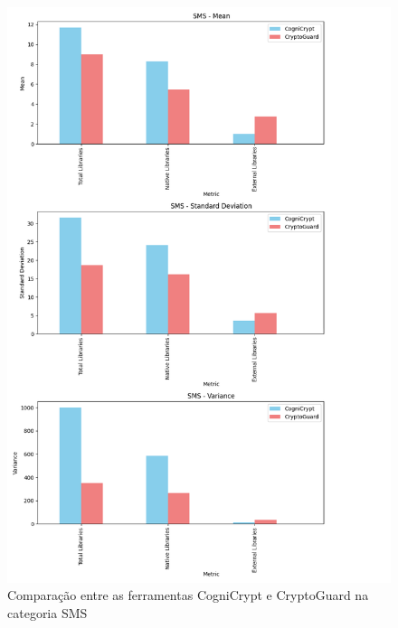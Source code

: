 \begin{figure}[!ht]
    \centering
    \includegraphics[scale=0.6]{img/plot_cc_x_cg_sms.png}
    \caption{Comparação entre as ferramentas CogniCrypt e CryptoGuard na categoria SMS}
    \label{img: CCvsCG_SMS}
\end{figure}

\FloatBarrier

